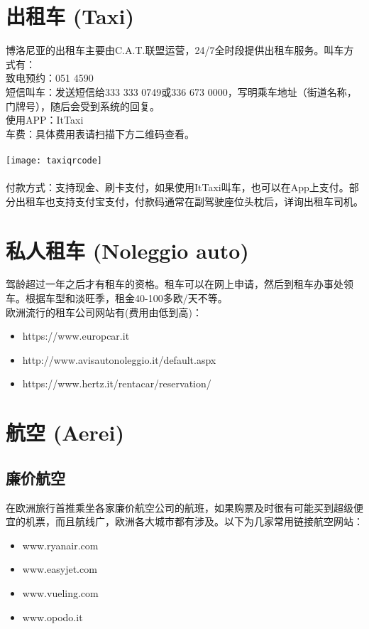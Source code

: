 \section{出租车 (Taxi)}
博洛尼亚的出租车主要由C.A.T.联盟运营，24/7全时段提供出租车服务。叫车方式有：\\
致电预约：051 4590\\
短信叫车：发送短信给333 333 0749或336 673 0000，写明乘车地址（街道名称，门牌号），随后会受到系统的回复。\\
使用APP：ItTaxi\\
车费：具体费用表请扫描下方二维码查看。\\
\\
\texttt{[image: taxiqrcode]}\\
\\
付款方式：支持现金、刷卡支付，如果使用ItTaxi叫车，也可以在App上支付。部分出租车也支持支付宝支付，付款码通常在副驾驶座位头枕后，详询出租车司机。


\section{私人租车 (Noleggio auto)}
驾龄超过一年之后才有租车的资格。租车可以在网上申请，然后到租车办事处领车。根据车型和淡旺季，租金40-100多欧/天不等。\\
欧洲流行的租车公司网站有(费用由低到高)：
\begin{itemize}
\item https://www.europcar.it
\item http://www.avisautonoleggio.it/default.aspx 
\item https://www.hertz.it/rentacar/reservation/
\end{itemize}


\section{航空 (Aerei)}

\subsection{廉价航空}
在欧洲旅行首推乘坐各家廉价航空公司的航班，如果购票及时很有可能买到超级便宜的机票，而且航线广，欧洲各大城市都有涉及。以下为几家常用链接航空网站：
\begin{itemize}
\item www.ryanair.com
\item www.easyjet.com
\item www.vueling.com
\item www.opodo.it
\end{itemize}

